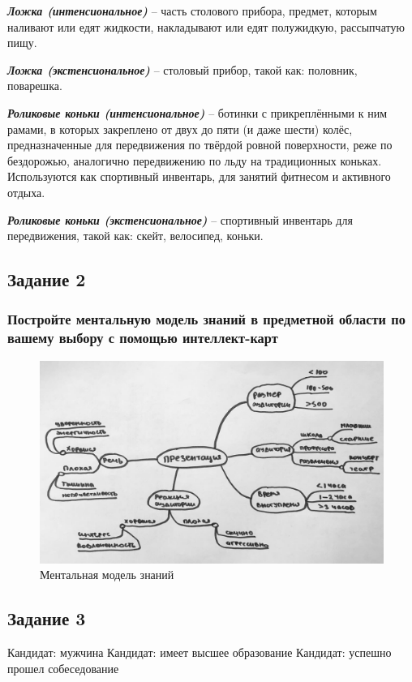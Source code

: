 \documentclass[14pt,a4paper,report]{report}
\begin{document}
\emph{\textbf{Ложка (интенсиональное)}} -- часть столового прибора, предмет, которым наливают или едят жидкости, накладывают или едят полужидкую, рассыпчатую пищу.

\emph{\textbf{Ложка (экстенсиональное)}} -- столовый прибор, такой как: половник, поварешка.

\emph{\textbf{Роликовые коньки (интенсиональное)}} -- ботинки с прикреплёнными к ним рамами, в которых закреплено от двух до пяти (и даже шести) колёс, предназначенные для передвижения по твёрдой ровной поверхности, реже по бездорожью, аналогично передвижению по льду на традиционных коньках. Используются как спортивный инвентарь, для занятий фитнесом и активного отдыха.

\emph{\textbf{Роликовые коньки (экстенсиональное)}} -- спортивный инвентарь для передвижения, такой как: скейт, велосипед, коньки.

\subsection{Задание 2}

\subsubsection{Постройте ментальную модель знаний в предметной области по вашему выбору с помощью интеллект-карт}

\begin{figure}[h!]
\centering
\includegraphics[scale = 0.35]{images/mindmap.jpg}
\caption{Ментальная модель знаний}
\label{image:1}
\end{figure}

\subsection{Задание 3}
Кандидат: мужчина
Кандидат: имеет высшее образование
Кандидат: успешно прошел собеседование
\end{document}
